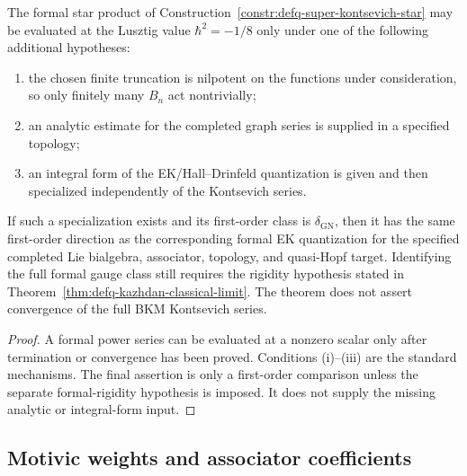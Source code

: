\begin{theorem}
\label{thm:defq-star-product-specialisation}
The formal star product of
Construction~\ref{constr:defq-super-kontsevich-star} may be evaluated
at the Lusztig value \(\hbar^2=-1/8\) only under one of the following
additional hypotheses:
\begin{enumerate}[label=\textup{(\roman*)}]
\item the chosen finite truncation is nilpotent on the functions under
 consideration, so only finitely many \(B_n\) act nontrivially;
\item an analytic estimate for the completed graph series is supplied
 in a specified topology;
\item an integral form of the EK/Hall--Drinfeld quantization is given
 and then specialized independently of the Kontsevich series.
\end{enumerate}
If such a specialization exists and its first-order class is
\(\delta_{\mathrm{GN}}\), then it has the same first-order direction as
the corresponding formal EK quantization for the specified completed
Lie bialgebra, associator, topology, and quasi-Hopf target. Identifying the full formal
gauge class still requires the rigidity hypothesis stated in
Theorem~\ref{thm:defq-kazhdan-classical-limit}. The theorem does not
assert convergence of the full BKM Kontsevich series.
\end{theorem}

\begin{proof}
A formal power series can be evaluated at a nonzero scalar only after
termination or convergence has been proved. Conditions (i)--(iii) are
the standard mechanisms. The final assertion is only a first-order
comparison unless the separate formal-rigidity hypothesis is imposed.
It does not supply the missing analytic or integral-form input.
\end{proof}

\subsection{Motivic weights and associator coefficients}
\label{subsec:defq-motivic-unified}

